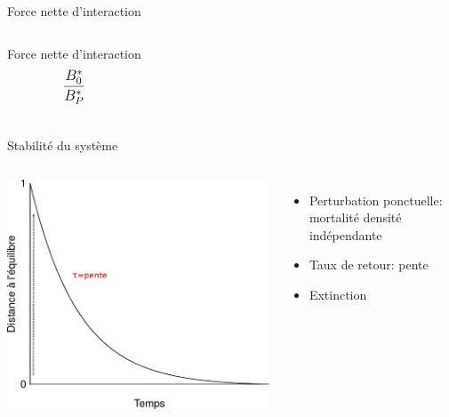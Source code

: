 \documentclass[11pt, compress, aspectratio=1610]{beamer}
\providecommand{\tightlist}{%
  \setlength{\itemsep}{0pt}\setlength{\parskip}{0pt}}
\newcommand{\begincols}{\begin{columns}}
\newcommand{\stopcols}{\end{columns}}
\begin{document}
\begin{frame}{Force nette d'interaction}

\begincols
  \centering
 \par

\hfill{}

\centering
Force nette d'interaction \[
\mathlarger{\dfrac{B^*_0}{B^*_P}}
\] \stopcols

\end{frame}

\begin{frame}{Stabilité du système}

\begincols
{}

\centering
\includegraphics[width=1\linewidth]{figuresAz/disequ.pdf}

\hfill{}

\begin{itemize}
\tightlist
\item
  Perturbation ponctuelle: mortalité densité indépendante
\item
  Taux de retour: pente
\item
  Extinction
\end{itemize}

\stopcols

\end{frame}
\end{document}
